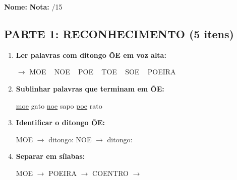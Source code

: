 \begin{exercicio}

\noindent\textbf{Nome:} \underline{\hspace{4cm}} \quad \textbf{Nota:} \underline{\hspace{1cm}}/15

\subsection*{PARTE 1: RECONHECIMENTO (5 itens)}

\begin{enumerate}
  \item \textbf{Ler palavras com ditongo \~OE em voz alta:}
  \begin{center}
  $\rightarrow$ MOE  ~  NOE  ~  POE  ~  TOE  ~  SOE  ~  POEIRA
  \end{center}

  \item \textbf{Sublinhar palavras que terminam em \~OE:}
  \begin{center}
  \uline{moe} \quad gato \quad \uline{noe} \quad sapo \quad \uline{poe} \quad rato
  \end{center}

  \item \textbf{Identificar o ditongo \~OE:}
  \begin{center}
  MOE $\rightarrow$ ditongo: \underline{\hspace{1cm}} \quad NOE $\rightarrow$ ditongo: \underline{\hspace{1cm}}
  \end{center}

  \item \textbf{Separar em sílabas:}
  \begin{center}
  MOE $\rightarrow$ \underline{\hspace{1.5cm}} \quad POEIRA $\rightarrow$ \underline{\hspace{1.5cm}} \underline{\hspace{1.5cm}} \underline{\hspace{1.5cm}} \quad COENTRO $\rightarrow$ \underline{\hspace{1.5cm}} \underline{\hspace{1.5cm}} \underline{\hspace{1.5cm}}
  \end{center}


\end{enumerate}
\end{exercicio}
